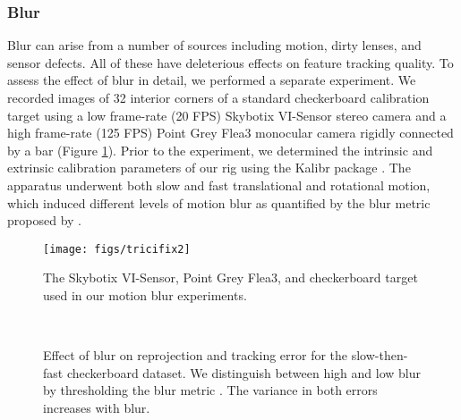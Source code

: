 \documentclass[letterpaper, 10 pt, conference]{ieeeconf}  %
\begin{document}
\subsubsection{Blur}
Blur can arise from a number of sources including motion, dirty lenses, and sensor defects.
All of these have deleterious effects on feature tracking quality.
To assess the effect of blur in detail, we performed a separate experiment.
We recorded images of 32 interior corners of a standard checkerboard calibration target using a low frame-rate (20 FPS) Skybotix VI-Sensor stereo camera and a high frame-rate (125 FPS) Point Grey Flea3 monocular camera rigidly connected by a bar (Figure \ref{fig:tricifix}).
Prior to the experiment, we determined the intrinsic and extrinsic calibration parameters of our rig using the Kalibr package \cite{Furgale:2013dm}.
The apparatus underwent both slow and fast translational and rotational motion, which induced different levels of motion blur as quantified by the blur metric proposed by \cite{Anonymous:Ngi3VEEU}.

\begin{figure}
    \centering
    \texttt{[image: figs/tricifix2]}
    \caption{The Skybotix VI-Sensor, Point Grey Flea3, and checkerboard target used in our motion blur experiments.}
    \label{fig:tricifix}
\end{figure}



\begin{figure*}
    \centering
    ~
    \caption{Effect of blur on reprojection and tracking error for the slow-then-fast checkerboard dataset. We distinguish between high and low blur by thresholding the blur metric \cite{Anonymous:Ngi3VEEU}. The variance in both errors increases with blur.}
    \label{fig:visensor_histograms}
\end{figure*}
\end{document}
